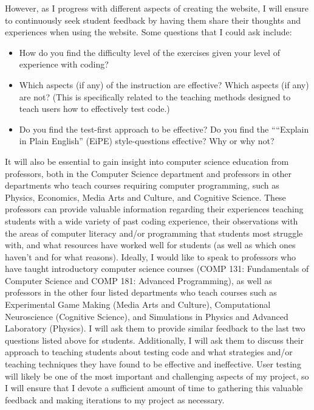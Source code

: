 \documentclass[10pt,twocolumn]{article}
\begin{document}
However, as I progress with different aspects of creating the website, I will ensure to continuously seek student feedback by having them share their thoughts and experiences when using the website. Some questions that I could ask include:
\begin{itemize}
    \item{How do you find the difficulty level of the exercises given your level of experience with coding?}
    \item{Which aspects (if any) of the instruction are effective? Which aspects (if any) are not? (This is specifically related to the teaching methods designed to teach users how to effectively test code.)}
    \item{Do you find the test-first approach to be effective? Do you find the ““Explain in Plain English” (EiPE) style-questions effective? Why or why not?}
\end{itemize}

It will also be essential to gain insight into computer science education from professors, both in the Computer Science department and professors in other departments who teach courses requiring computer programming, such as Physics, Economics, Media Arts and Culture, and Cognitive Science. These professors can provide valuable information regarding their experiences teaching students with a wide variety of past coding experience, their observations with the areas of computer literacy and/or programming that students most struggle with, and what resources have worked well for students (as well as which ones haven’t and for what reasons). Ideally, I would like to speak to professors who have taught introductory computer science courses (COMP 131: Fundamentals of Computer Science and COMP 181: Advanced Programming), as well as professors in the other four listed departments who teach courses such as Experimental Game Making (Media Arts and Culture), Computational Neuroscience (Cognitive Science), and Simulations in Physics and Advanced Laboratory (Physics). I will ask them to provide similar feedback to the last two questions listed above for students. Additionally, I will ask them to discuss their approach to teaching students about testing code and what strategies and/or teaching techniques they have found to be effective and ineffective. User testing will likely be one of the most important and challenging aspects of my project, so I will ensure that I devote a sufficient amount of time to gathering this valuable feedback and making iterations to my project as necessary.


\printbibliography
\end{document}
